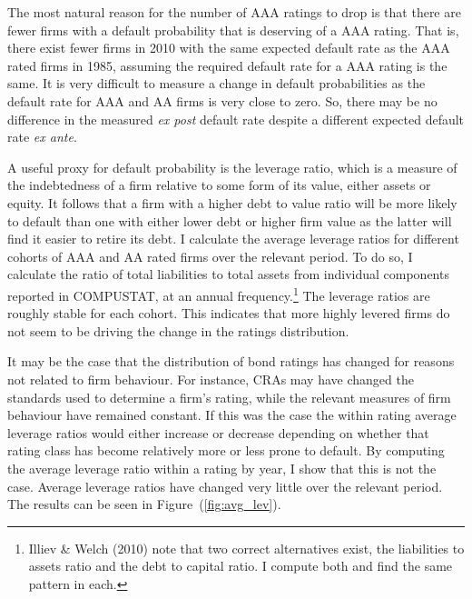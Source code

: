 \documentclass[notitlepage]{article}
\begin{document}
The most natural reason for the number of AAA ratings to drop is that there are fewer firms with a default probability that is deserving of a AAA rating. That is, there exist fewer firms in 2010 with the same expected default rate as the AAA rated firms in 1985, assuming the required default rate for a AAA rating is the same. It is very difficult to measure a change in default probabilities as the default rate for AAA and AA firms is very close to zero. So, there may be no difference in the measured \emph{ex post} default rate despite a different expected default rate \textit{ex ante}. 

A useful proxy for default probability is the leverage ratio, which is a measure of the indebtedness of a firm relative to some form of its value, either assets or equity. It follows that a firm with a higher debt to value ratio will be more likely to default than one with either lower debt or higher firm value as the latter will find it easier to retire its debt. I calculate the average leverage ratios for different cohorts of AAA and AA rated firms over the relevant period. To do so, I calculate the ratio of total liabilities to total assets from individual components reported in COMPUSTAT, at an annual frequency.\footnote{Illiev \& Welch (2010) note that two correct alternatives exist, the liabilities to assets ratio and the debt to capital ratio. I compute both and find the same pattern in each.} The leverage ratios are roughly stable for each cohort. This indicates that more highly levered firms do not seem to be driving the change in the ratings distribution.

% 
It may be the case that the distribution of bond ratings has changed for reasons not related to firm behaviour. For instance, CRAs may have changed the standards used to determine a firm's rating, while the relevant measures of firm behaviour have remained constant. If this was the case the within rating average leverage ratios would either increase or decrease depending on whether that rating class has become relatively more or less prone to default. By computing the average leverage ratio within a rating by year, I show that this is not the case. Average leverage ratios have changed very little over the relevant period. The results can be seen in Figure~(\ref{fig:avg_lev}). 
\end{document}
